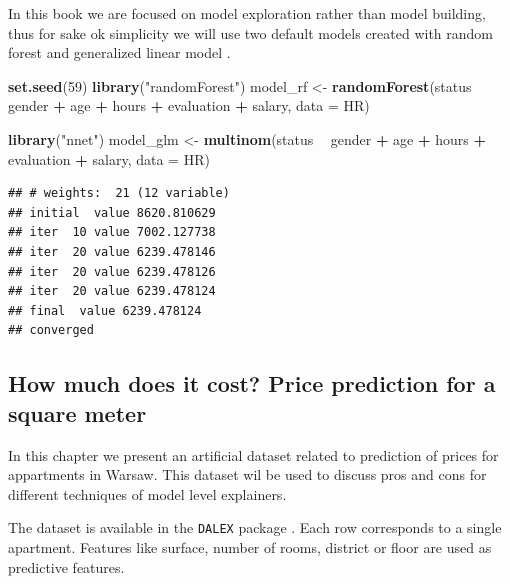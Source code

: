 \documentclass[]{krantz}
\newenvironment{Shaded}{\begin{snugshade}}{\end{snugshade}}
\newcommand{\DataTypeTok}[1]{\textcolor[rgb]{0.13,0.29,0.53}{#1}}
\newcommand{\DecValTok}[1]{\textcolor[rgb]{0.00,0.00,0.81}{#1}}
\newcommand{\KeywordTok}[1]{\textcolor[rgb]{0.13,0.29,0.53}{\textbf{#1}}}
\newcommand{\NormalTok}[1]{#1}
\newcommand{\OperatorTok}[1]{\textcolor[rgb]{0.81,0.36,0.00}{\textbf{#1}}}
\newcommand{\StringTok}[1]{\textcolor[rgb]{0.31,0.60,0.02}{#1}}
\theoremstyle{definition}
\theoremstyle{definition}
\theoremstyle{definition}
\theoremstyle{remark}
\begin{document}
In this book we are focused on model exploration rather than model
building, thus for sake ok simplicity we will use two default models
created with random forest \citep{R-randomForest} and generalized linear
model \citep{R-nnet}.

\begin{Shaded}
\begin{Highlighting}[]
\KeywordTok{set.seed}\NormalTok{(}\DecValTok{59}\NormalTok{)}
\KeywordTok{library}\NormalTok{(}\StringTok{"randomForest"}\NormalTok{)}
\NormalTok{model_rf <-}\StringTok{ }\KeywordTok{randomForest}\NormalTok{(status }\OperatorTok{~}\StringTok{ }\NormalTok{gender }\OperatorTok{+}\StringTok{ }\NormalTok{age }\OperatorTok{+}\StringTok{ }\NormalTok{hours }\OperatorTok{+}\StringTok{ }\NormalTok{evaluation }\OperatorTok{+}\StringTok{ }\NormalTok{salary, }\DataTypeTok{data =}\NormalTok{ HR)}

\KeywordTok{library}\NormalTok{(}\StringTok{"nnet"}\NormalTok{)}
\NormalTok{model_glm <-}\StringTok{ }\KeywordTok{multinom}\NormalTok{(status }\OperatorTok{~}\StringTok{ }\NormalTok{gender }\OperatorTok{+}\StringTok{ }\NormalTok{age }\OperatorTok{+}\StringTok{ }\NormalTok{hours }\OperatorTok{+}\StringTok{ }\NormalTok{evaluation }\OperatorTok{+}\StringTok{ }\NormalTok{salary, }\DataTypeTok{data =}\NormalTok{ HR)}
\end{Highlighting}
\end{Shaded}

\begin{verbatim}
## # weights:  21 (12 variable)
## initial  value 8620.810629 
## iter  10 value 7002.127738
## iter  20 value 6239.478146
## iter  20 value 6239.478126
## iter  20 value 6239.478124
## final  value 6239.478124 
## converged
\end{verbatim}

\hypertarget{apartmentsDataset}{%
\subsection{How much does it cost? Price prediction for a square
meter}\label{apartmentsDataset}}

In this chapter we present an artificial dataset related to prediction
of prices for appartments in Warsaw. This dataset wil be used to discuss
pros and cons for different techniques of model level explainers.

The dataset is available in the \texttt{DALEX} package \citep{R-DALEX}.
Each row corresponds to a single apartment. Features like surface,
number of rooms, district or floor are used as predictive features.
\end{document}
